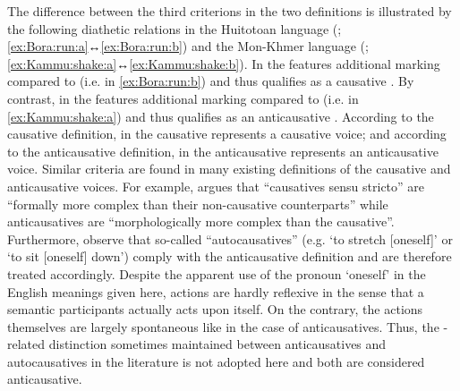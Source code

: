 The difference between the third criterions in the two definitions is illustrated by the following diathetic relations in the Huitotoan language  (; \ref{ex:Bora:run:a}↔\ref{ex:Bora:run:b}) and the Mon-Khmer language  (; \ref{ex:Kammu:shake:a}↔\ref{ex:Kammu:shake:b}). In the    features additional marking compared to  (i.e.  in \ref{ex:Bora:run:b}) and thus qualifies as a causative . By contrast, in the    features additional marking compared to  (i.e.  in \ref{ex:Kammu:shake:a}) and thus qualifies as an anticausative . According to the causative definition,  in the  causative  represents a causative voice; and according to the anticausative definition,  in the  anticausative  represents an anticausative voice. Similar criteria are found in many existing definitions of the causative and anticausative voices. For example, \cite[888]{kulikov:2001} argues that “causatives sensu stricto” are “formally more complex than their non-causative counterparts” while anticausatives are “morphologically more complex than the causative”. Furthermore, observe that so-called “autocausatives” (e.g. ‘to stretch [oneself]’ or ‘to sit [oneself] down’) comply with the anticausative definition and are therefore treated accordingly. Despite the apparent use of the pronoun ‘oneself’ in the English meanings given here,  actions are hardly reflexive in the sense that a semantic participants actually acts upon itself. On the contrary, the actions themselves are largely spontaneous like in the case of anticausatives. Thus, the -related distinction sometimes maintained between anticausatives and autocausatives in the literature is not adopted here and both are considered anticausative.

